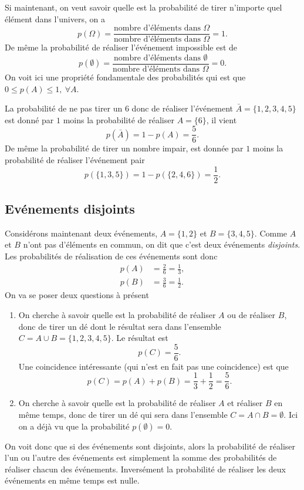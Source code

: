 \documentclass[a4paper,12pt]{book}
\begin{document}
Si maintenant, on veut savoir quelle est la probabilité de tirer n'importe quel élément dans l'univers, on a
\begin{equation}
p(\Omega)=\frac{\mbox{nombre d'éléments dans }\Omega}{\mbox{nombre d'éléments dans }\Omega}=1.
\end{equation}
De même la probabilité de réaliser l'événement impossible est de 
\begin{equation}
p(\emptyset)=\frac{\mbox{nombre d'éléments dans }\emptyset}{\mbox{nombre d'éléments dans }\Omega}=0.
\end{equation}
On voit ici une propriété fondamentale des probabilités qui est que $0\leq p(A)\leq 1,\ \forall A$.

La probabilité de ne pas tirer un 6 donc de réaliser l'événement $\bar A=\{1,2,3,4,5\}$ est donné par 
$1$ moins la probabilité de réaliser $A=\{6\}$, il vient
\begin{equation}
 p(\bar A)=1-p(A)=\frac{5}{6}.
\end{equation}
De même la probabilité de tirer un nombre impair, est donnée par $1$ moins la probabilité de réaliser 
l'événement pair
\begin{equation}
 p(\{1,3,5\})=1-p(\{2,4,6\})=\frac{1}{2}.
\end{equation}


\subsection{Evénements disjoints}\label{subsec_disjoints}
Considérons maintenant deux événements, $A=\{1,2\}$ et $B=\{3,4,5\}$. 
Comme $A$ et $B$ n'ont pas d'éléments en commun, on dit que c'est deux événements \textit{disjoints}. 
Les probabilités de réalisation de ces événements sont donc
\begin{align}
 p(A)&=\frac{2}{6}=\frac{1}{3},\\
 p(B)&=\frac{3}{6}=\frac{1}{2}.
\end{align}
On va se poser deux questions à présent
\begin{enumerate}
 \item On cherche à savoir quelle est la probabilité de réaliser $A$ ou de réaliser $B$, donc de tirer 
 un dé dont le résultat sera dans l'ensemble $C=A\cup B=\{1,2,3,4,5\}$. Le résultat est
 \begin{equation}
 p(C)=\frac{5}{6}.
 \end{equation}
 Une coincidence intéressante (qui n'est en fait pas une coincidence) est que
 \begin{equation}
 p(C)=p(A)+p(B)=\frac{1}{3}+\frac{1}{2}=\frac{5}{6}.
 \end{equation}
 \item On cherche à savoir quelle est la probabilité de réaliser $A$ et réaliser $B$ en même temps,
 donc de tirer un dé qui sera dans l'ensemble $C=A\cap B=\emptyset$. Ici on a déjà vu 
 que la probabilité $p(\emptyset)=0$.
\end{enumerate}
On voit donc que si des événements sont disjoints, alors la probabilité de réaliser 
l'un ou l'autre des événements est simplement la somme des probabilités de réaliser chacun des événements.
Inversément la probabilité de réaliser les deux événements en même temps est nulle.
\end{document}

